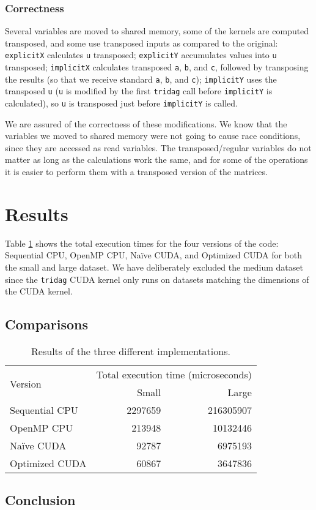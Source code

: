\documentclass[12pt, oneside]{article}
\begin{document}
\subsubsection{Correctness}
Several variables are moved to shared memory, some of the kernels are computed transposed, and some use transposed inputs as compared to the original: \texttt{explicitX} calculates \texttt{u} transposed; \texttt{explicitY} accumulates values into \texttt{u} transposed; \texttt{implicitX} calculates transposed \texttt{a}, \texttt{b}, and \texttt{c}, followed by transposing the results (so that we receive standard \texttt{a}, \texttt{b}, and \texttt{c}); \texttt{implicitY} uses the transposed \texttt{u} (\texttt{u} is modified by the first \texttt{tridag} call before \texttt{implicitY} is calculated), so \texttt{u} is transposed just before \texttt{implicitY} is called.

We are assured of the correctness of these modifications. We know that the variables we moved to shared memory were not going to cause race conditions, since they are accessed as read variables. The transposed/regular variables do not matter as long as the calculations work the same, and for some of the operations it is easier to perform them with a transposed version of the matrices.
\section{Results}
Table \ref{fig:results} shows the total execution times for the four versions of the code: Sequential CPU, OpenMP CPU, Na\"ive CUDA, and Optimized CUDA for both the small and large dataset. We have deliberately excluded the medium dataset since the \texttt{tridag} CUDA kernel only runs on datasets matching the dimensions of the CUDA kernel.
\subsection{Comparisons}
\begin{table}[h]
\centering
\begin{tabular}{l r r}
\toprule
\multirow{2}{*}{Version}        & \multicolumn{2}{c}{Total execution time (microseconds)} \\
                    & Small     & Large \\
\midrule
Sequential CPU      & 2297659   & 216305907 \\
OpenMP CPU          & 213948    & 10132446  \\
Na\"ive CUDA        & 92787     & 6975193   \\
Optimized CUDA      & 60867     & 3647836   \\
\bottomrule
\end{tabular}
\caption{\label{fig:results} Results of the three different implementations.}
\end{table}
\subsection{Conclusion}


\end{document}
